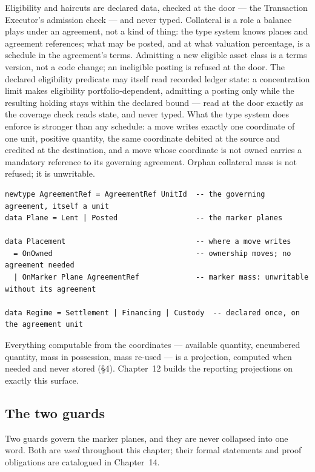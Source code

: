 Eligibility and haircuts are declared data, checked at the door --- the
Transaction Executor's admission check --- and never typed. Collateral is a
role a balance plays under an agreement, not a kind of thing: the type system
knows planes and agreement references; what may be posted, and at what
valuation percentage, is a schedule in the agreement's terms. Admitting a new
eligible asset class is a terms version, not a code change; an ineligible
posting is refused at the door. The declared eligibility predicate may itself read
recorded ledger state: a concentration limit makes eligibility portfolio-dependent,
admitting a posting only while the resulting holding stays within the declared bound
--- read at the door exactly as the coverage check reads state, and never typed. What
the type system does enforce is stronger
than any schedule: a move writes exactly one coordinate of one unit, positive
quantity, the same coordinate debited at the source and credited at the
destination, and a move whose coordinate is not owned carries a mandatory
reference to its governing agreement. Orphan collateral mass is not refused;
it is unwritable.

\begin{lstlisting}
newtype AgreementRef = AgreementRef UnitId  -- the governing agreement, itself a unit
data Plane = Lent | Posted                  -- the marker planes

data Placement                              -- where a move writes
  = OnOwned                                 -- ownership moves; no agreement needed
  | OnMarker Plane AgreementRef             -- marker mass: unwritable without its agreement

data Regime = Settlement | Financing | Custody  -- declared once, on the agreement unit
\end{lstlisting}

Everything computable from the coordinates --- available quantity, encumbered
quantity, mass in possession, mass re-used --- is a projection, computed when
needed and never stored (\S4). Chapter~12 builds the reporting projections on
exactly this surface.

\subsection{The two guards}

Two guards govern the marker planes, and they are never collapsed into one
word. Both are \emph{used} throughout this chapter; their formal statements and
proof obligations are catalogued in Chapter~14.

